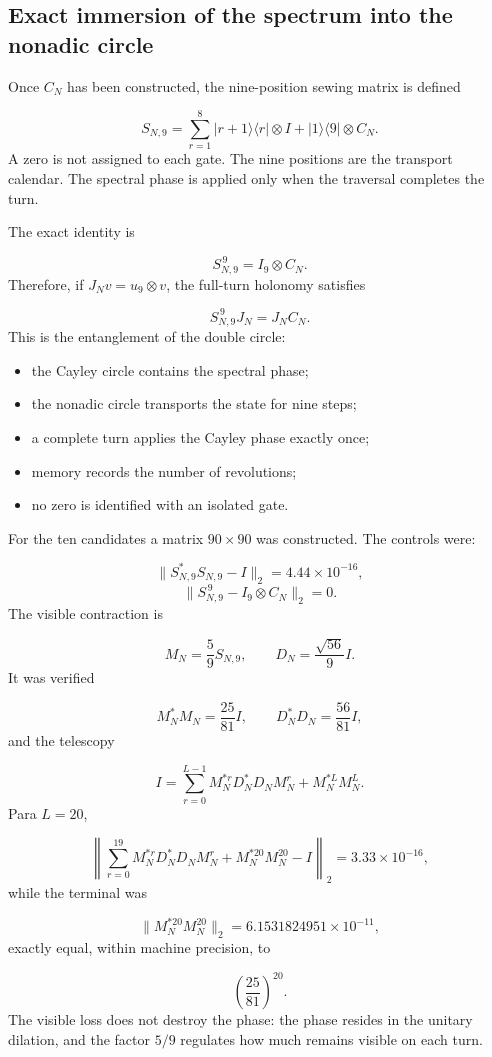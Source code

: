 \subsection{Exact immersion of the spectrum into the nonadic circle}
Once \(C_N\) has been constructed, the nine-position sewing matrix is defined\par
\[
S_{N,9}
=
\sum_{r=1}^{8}
|r+1\rangle\langle r|\otimes I
+
|1\rangle\langle9|\otimes C_N.
\]
A zero is not assigned to each gate. The nine positions are the transport calendar. The spectral phase is applied only when the traversal completes the turn.\par
The exact identity is\par
\[
S_{N,9}^{\,9}=I_9\otimes C_N.
\]
Therefore, if \(J_Nv=u_9\otimes v\), the full-turn holonomy satisfies\par
\[
S_{N,9}^{\,9}J_N=J_NC_N.
\]
This is the entanglement of the double circle:\par
\begin{itemize}
\item the Cayley circle contains the spectral phase;
\item the nonadic circle transports the state for nine steps;
\item a complete turn applies the Cayley phase exactly once;
\item memory records the number of revolutions;
\item no zero is identified with an isolated gate.
\end{itemize}
For the ten candidates a matrix \(90\times90\) was constructed. The controls were:\par
\[
\|S_{N,9}^*S_{N,9}-I\|_2
=
4.44\times10^{-16},
\]
\[
\|S_{N,9}^{\,9}-I_9\otimes C_N\|_2=0.
\]
The visible contraction is\par
\[
M_N=\frac59S_{N,9},
\qquad
D_N=\frac{\sqrt{56}}9I.
\]
It was verified\par
\[
M_N^*M_N=\frac{25}{81}I,
\qquad
D_N^*D_N=\frac{56}{81}I,
\]
and the telescopy\par
\[
I=
\sum_{r=0}^{L-1}
M_N^{*r}D_N^*D_NM_N^r
+
M_N^{*L}M_N^L.
\]
Para \(L=20\),\par
\[
\left\|
\sum_{r=0}^{19}M_N^{*r}D_N^*D_NM_N^r
+
M_N^{*20}M_N^{20}
-I
\right\|_2
=
3.33\times10^{-16},
\]
while the terminal was\par
\[
\|M_N^{*20}M_N^{20}\|_2
=
6.1531824951\times10^{-11},
\]
exactly equal, within machine precision, to\par
\[
\left(\frac{25}{81}\right)^{20}.
\]
The visible loss does not destroy the phase: the phase resides in the unitary dilation, and the factor \(5/9\) regulates how much remains visible on each turn.\par
{}
